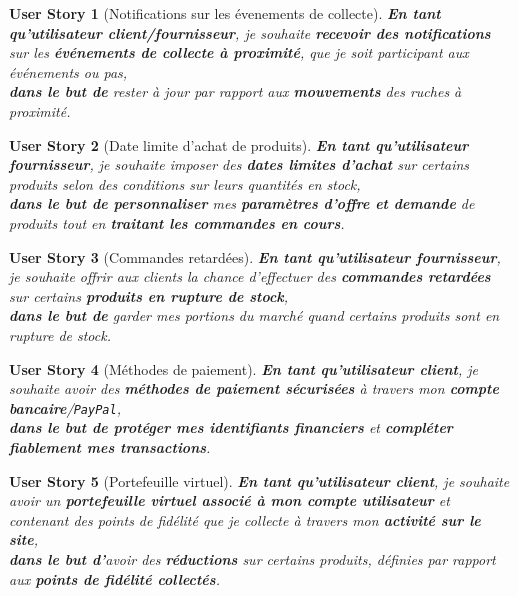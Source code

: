 \documentclass[a4paper,12pt]{book}
\theoremstyle{break}
\newtheorem*{userStory}{User Story}
\theoremstyle{break}
\theoremstyle{break}
\theoremstyle{break}
\theoremstyle{definition}
\theoremstyle{remark}
\begin{document}
\begin{userStory}[Notifications sur les évenements de collecte]
\textbf{En tant qu'utilisateur {\color{green}client}/{\color{red}fournisseur}}, je souhaite \textbf{recevoir des notifications} sur les \textbf{événements de collecte à proximité}, que je soit participant aux événements ou pas,\\
\indent
\textbf{dans le but de} rester à jour par rapport aux \textbf{mouvements} des ruches à proximité.
\end{userStory}

\begin{userStory}[Date limite d'achat de produits]
\textbf{En tant qu'utilisateur {\color{red}fournisseur}}, je souhaite imposer des \textbf{dates limites d'achat} sur certains produits selon des conditions sur leurs quantités en stock,\\
\indent
\textbf{dans le but de personnaliser} mes \textbf{paramètres d'offre et demande} de produits tout en \textbf{traitant les commandes en cours}.
\end{userStory}

\begin{userStory}[Commandes retardées]
\textbf{En tant qu'utilisateur {\color{red}fournisseur}}, je souhaite offrir aux clients la chance d'effectuer des \textbf{commandes retardées} sur certains \textbf{produits en rupture de stock},\\
\indent
\textbf{dans le but de} garder mes portions du marché quand certains produits sont en rupture de stock.
\end{userStory}

\begin{userStory}[Méthodes de paiement]
\textbf{En tant qu'utilisateur {\color{green}client}}, je souhaite avoir des \textbf{méthodes de paiement sécurisées} à travers mon \textbf{compte bancaire}/\texttt{PayPal},\\
\indent
\textbf{dans le but de protéger mes identifiants financiers} et \textbf{compléter fiablement mes transactions}.
\end{userStory}

\begin{userStory}[Portefeuille virtuel]
\textbf{En tant qu'utilisateur {\color{green}client}}, je souhaite avoir un \textbf{portefeuille virtuel associé à mon compte utilisateur} et contenant des points de fidélité que je collecte à travers mon \textbf{activité sur le site},\\
\indent
\textbf{dans le but d'}avoir des \textbf{réductions} sur certains produits, définies par rapport aux \textbf{points de fidélité collectés}.
\end{userStory}
\end{document}
